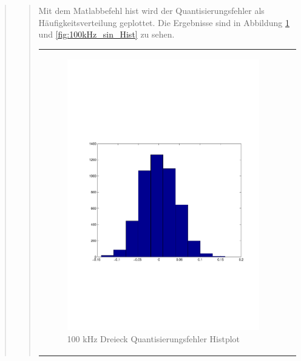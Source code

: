 \begin{quote}
\begin{quote}
        Mit dem Matlabbefehl hist wird der Quantisierungsfehler als Häufigkeitsverteilung geplottet. Die Ergebnisse sind in
        Abbildung \ref{fig:100kHz_drei_Hist} und \ref{fig:100kHz_sin_Hist} zu sehen.
        
        \begin{center}
            \begin{tabular}{ll}
            
            \hspace{-4cm}
                \begin{minipage}{0.6\textwidth}
                    \begin{figure}[H]
                        \includegraphics[scale=0.5, trim = 16mm 70mm 16mm 85mm, clip]
                                        {Bilder/100kHz_dreieck_Quant_Hist}
                        \caption{100 kHz Dreieck Quantisierungsfehler Histplot}
                        \label{fig:100kHz_drei_Hist}
                    \end{figure}
                \end{minipage}
                

\end{tabular}
\end{center}
\end{quote}
\end{quote}
